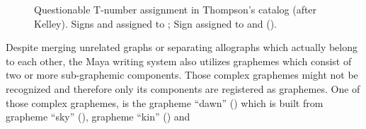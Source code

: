 \documentclass[../main.tex]{subfiles}
\begin{document}
\begin{figure}
    \centering
    \caption[Questionable T-number assignment in Thompson's catalog]{Questionable T-number 
            assignment in Thompson's catalog (after Kelley).
             Signs  and  
            assigned to ;
             Sign  assigned to  and 
             (\authordrawings).}
\end{figure}
Despite merging unrelated graphs or separating allographs which actually belong to each other,
the Maya writing system also utilizes graphemes which consist of two or more sub-graphemic 
components.
Those complex graphemes might not be recognized and therefore only its components are registered
as graphemes.
One of those complex graphemes, is the grapheme  ``dawn'' 
() which is built from
grapheme  ``sky'' (), 
grapheme  ``k\glottalstop{}in'' () and
\end{document}
